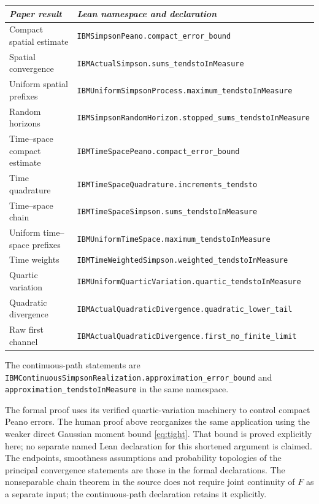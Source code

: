 \documentclass[11pt]{article}
\theoremstyle{remark}\newtheorem{remark}[theorem]{Remark}
\newcommand{\code}[1]{{\small\nolinkurl{#1}}}
\begin{document}
\begin{longtable}{@{}p{}p{}@{}}
\textit{Paper result}&\textit{Lean namespace and declaration}\\\hline
Compact spatial estimate&\code{IBMSimpsonPeano.compact_error_bound}\\[3pt]
Spatial convergence&\code{IBMActualSimpson.sums_tendstoInMeasure}\\[3pt]
Uniform spatial prefixes&\code{IBMUniformSimpsonProcess.maximum_tendstoInMeasure}\\[3pt]
Random horizons&\code{IBMSimpsonRandomHorizon.stopped_sums_tendstoInMeasure}\\[3pt]
Time--space compact estimate&\code{IBMTimeSpacePeano.compact_error_bound}\\[3pt]
Time quadrature&\code{IBMTimeSpaceQuadrature.increments_tendsto}\\[3pt]
Time--space chain&\code{IBMTimeSpaceSimpson.sums_tendstoInMeasure}\\[3pt]
Uniform time--space prefixes&\code{IBMUniformTimeSpace.maximum_tendstoInMeasure}\\[3pt]
Time weights&\code{IBMTimeWeightedSimpson.weighted_tendstoInMeasure}\\
Quartic variation&\code{IBMUniformQuarticVariation.quartic_tendstoInMeasure}\\[3pt]
Quadratic divergence&\code{IBMActualQuadraticDivergence.quadratic_lower_tail}\\[3pt]
Raw first channel&\code{IBMActualQuadraticDivergence.first_no_finite_limit}\\
\end{longtable}

The continuous-path statements are
\code{IBMContinuousSimpsonRealization.approximation_error_bound}
and \code{approximation_tendstoInMeasure} in the same namespace.

The formal proof uses its verified quartic-variation machinery to
control compact Peano errors. The human proof above reorganizes
the same application using the weaker direct Gaussian moment
bound \eqref{eq:tight}. That bound is proved explicitly here;
no separate named Lean declaration for this shortened argument
is claimed. The endpoints, smoothness assumptions and probability
topologies of the principal convergence statements are those
in the formal declarations. The nonseparable chain theorem in
the source does not require joint continuity of $F$ as a separate
input; the continuous-path declaration retains it explicitly.
\end{document}
